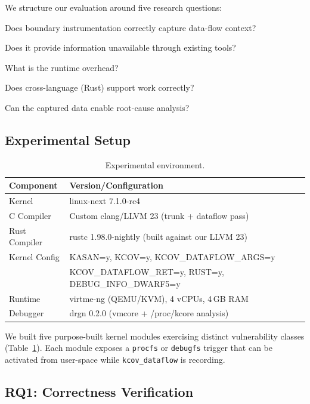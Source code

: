 \documentclass{ndss}
\begin{document}
We structure our evaluation around five research questions:
\begin{description}[nosep]
  \item[RQ1] Does boundary instrumentation correctly capture data-flow context?
  \item[RQ2] Does it provide information unavailable through existing tools?
  \item[RQ3] What is the runtime overhead?
  \item[RQ4] Does cross-language (Rust) support work correctly?
  \item[RQ5] Can the captured data enable root-cause analysis?
\end{description}

\subsection{Experimental Setup}\label{sec:setup}

\begin{table}[t]
\centering
\caption{Experimental environment.}\label{tab:env}
\small
\begin{tabular}{@{}ll@{}}
\toprule
\textbf{Component} & \textbf{Version/Configuration} \\
\midrule
Kernel & linux-next 7.1.0-rc4 \\
C Compiler & Custom clang/LLVM 23 (trunk + dataflow pass) \\
Rust Compiler & rustc 1.98.0-nightly (built against our LLVM 23) \\
Kernel Config & KASAN=y, KCOV=y, KCOV\_DATAFLOW\_ARGS=y \\
              & KCOV\_DATAFLOW\_RET=y, RUST=y, DEBUG\_INFO\_DWARF5=y \\
Runtime & virtme-ng (QEMU/KVM), 4 vCPUs, 4\,GB RAM \\
Debugger & drgn 0.2.0 (vmcore + /proc/kcore analysis) \\
\bottomrule
\end{tabular}
\end{table}

We built five purpose-built kernel modules exercising distinct vulnerability
classes (Table~\ref{tab:env}). Each module exposes a \texttt{procfs} or
\texttt{debugfs} trigger that can be activated from user-space while
\texttt{kcov\_dataflow} is recording.

\subsection{RQ1: Correctness Verification}\label{sec:rq1}
\end{document}
